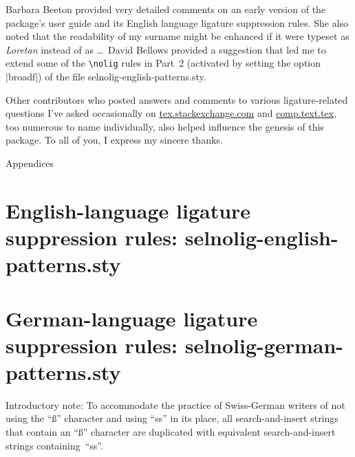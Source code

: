 \documentclass[11pt]{article}
\newcommand{\pkg}[1]{\textsf{#1}}
\newcommand{\cmmd}[1]{\texttt{\textbackslash #1}}
\let\oldappendix\appendix
\renewcommand\appendix{%
   \addtocontents{toc}{\protect{\vspace{1\baselineskip}}}
   \addtocontents{toc}{\protect{\mdseries Appendices\par}}
   \noindent
   {\Large Appendices}
   \oldappendix}
\begin{document}
Barbara Beeton provided very detailed comments on an early version of the package's user guide and its English language ligature suppression rules. She also noted that the readability of my surname might be enhanced if it were typeset as \emph{Loretan} instead of as \emph{}\dots\ David Bellows provided a suggestion that led me to extend some of the \cmmd{nolig} rules in Part~2 (activated by setting the option |broadf|) of the file \pkg{selnolig-english-patterns.sty}.

Other contributors who posted answers and comments to various ligature-related questions I've asked occasionally on \href{http://tex.stackexchange.com/}{tex.stackexchange.com} and \href{https://groups.google.com/forum/#!forum/comp.text.tex}{comp.text.tex}, too numerous to name individually, also helped influence the genesis of this package. To all of you, I express my sincere thanks.



\clearpage
\appendix
\selnoligoff  %


\small %


\section[The package's English-language ligature suppression rules]{English-language ligature suppression rules: 
\pkg{selnolig-english-patterns.sty}}
\label{sec:eng-listing}

\begin{multicols}{2}
\end{multicols}

\clearpage
\section[The package's German-language ligature suppression rules]{German-language ligature suppression rules: \pkg{selnolig-german-patterns.sty}}
\label{sec:germ-listing}

Introductory note: To accommodate the practice of Swiss-German writers of not using the \enquote{ß} character and using \enquote{ss} in its place, all search-and-insert strings that contain an \enquote{ß} character are duplicated with equivalent search-and-insert strings containing~\enquote{ss}.
\end{document}
